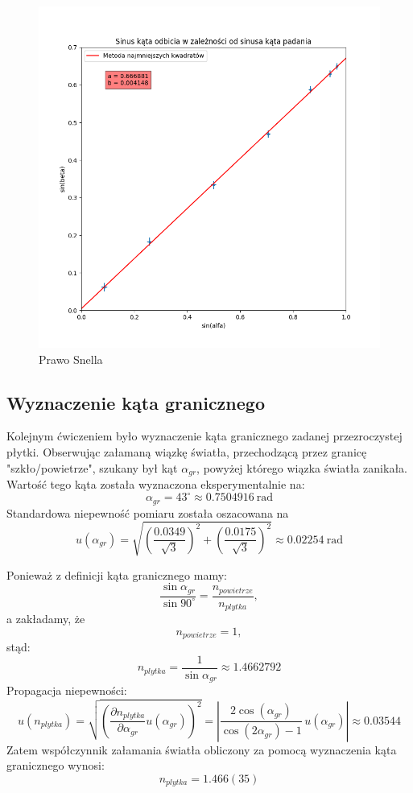 \documentclass[a4paper]{article}
\begin{document}
\begin{figure}
\centering
\includegraphics[scale=0.7]{snell.png}
\caption{Prawo Snella}
\label{snell-wykres}
\end{figure}


\subsection{Wyznaczenie kąta granicznego}
Kolejnym ćwiczeniem było wyznaczenie kąta granicznego zadanej przezroczystej płytki.
Obserwując załamaną wiązkę światła, przechodzącą przez granicę "szkło/powietrze", szukany był kąt $\alpha_{gr}$, powyżej którego wiązka światła zanikała.
Wartość tego kąta została wyznaczona eksperymentalnie na: 
\[
\alpha_{gr} = 43^\circ \approx 0.7504916 \ \text{rad}
\]
Standardowa niepewność pomiaru została oszacowana na 
\[
u(\alpha_{gr}) = \sqrt{ \left( \frac{0.0349}{\sqrt{3}} \right)^2 + \left( \frac{0.0175}{\sqrt{3}} \right)^2}
\approx 0.02254 \ \text{rad}
\]

Ponieważ z definicji kąta granicznego mamy: 
\[ 
	\frac{\sin \alpha_{gr}}{\sin 90^\circ} = \frac{n_{powietrze}}{n_{plytka}} ,
\]
a zakładamy, że
\[ 
	n_{powietrze} = 1,
\]
stąd:
\[
	n_{plytka} = \frac{1}{\sin \alpha_{gr}} \approx 1.4662792
\]
Propagacja niepewności:
\[
	u(n_{plytka}) = \sqrt{\left( \frac{\partial n_{plytka}}{\partial \alpha_{gr}}u(\alpha_{gr})\right)^2} = 
	\left| \frac{2\cos(\alpha_{gr})}{\cos(2\alpha_{gr})-1} \, u(\alpha_{gr}) \right| \approx 0.03544
\]
Zatem współczynnik załamania światła obliczony za pomocą wyznaczenia kąta granicznego wynosi:
\[
	n_{plytka} = 1.466(35)
\]
\end{document}
